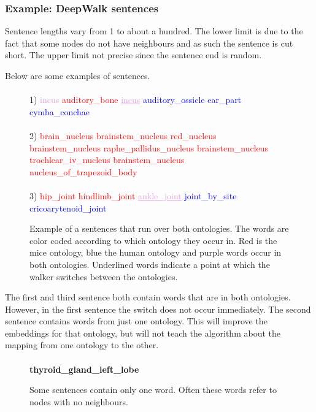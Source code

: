 \documentclass{article}
\begin{document}
 \subsubsection{Example: DeepWalk sentences} \label{sentences}
 Sentence lengths vary from 1 to about a hundred. The lower limit is due to the fact that some nodes do not have neighbours and as such the sentence is cut short. The upper limit not precise since the sentence end is random.
 
 Below are some examples of sentences.
 \begin{figure}[H]
 \paragraph{}
 1) \textcolor{Plum}{incus} \textcolor{red}{auditory\_bone} \textcolor{Plum}{\underline{incus}} \textcolor{blue}{ auditory\_ossicle ear\_part cymba\_conchae}
 \paragraph{}
 2) \textcolor{red}{brain\_nucleus brainstem\_nucleus red\_nucleus brainstem\_nucleus raphe\_pallidus\_nucleus brainstem\_nucleus trochlear\_iv\_nucleus brainstem\_nucleus nucleus\_of\_trapezoid\_body}
  \paragraph{}
 3) \textcolor{red}{hip\_joint hindlimb\_joint} \textcolor{Plum}{\underline{ankle\_joint}} \textcolor{blue}{joint\_by\_site cricoarytenoid\_joint}
  \label{jumpingsentence}
  \caption[Sentence that runs over both ontologies]{Example of a sentences that run over both ontologies. The words are color coded according to which ontology they occur in. Red is the mice ontology, blue the human ontology and purple words occur in both ontologies. Underlined words indicate a point at which the walker switches between the ontologies.}
 \end{figure}
 
 The first and third sentence both contain words that are in both ontologies. However, in the first sentence the switch does not occur immediately. The second sentence contains words from just one ontology. This will improve the embeddings for that ontology, but will not teach the algorithm about the mapping from one ontology to the other.
 
 \begin{figure}[H]
 \paragraph{}
 \textbf{thyroid\_gland\_left\_lobe}
 \label{singlesentence}
 \caption[Sentence with single word]{Some sentences contain only one word. Often these words refer to nodes with no neighbours.}
 \end{figure}
 \newpage
\end{document}
